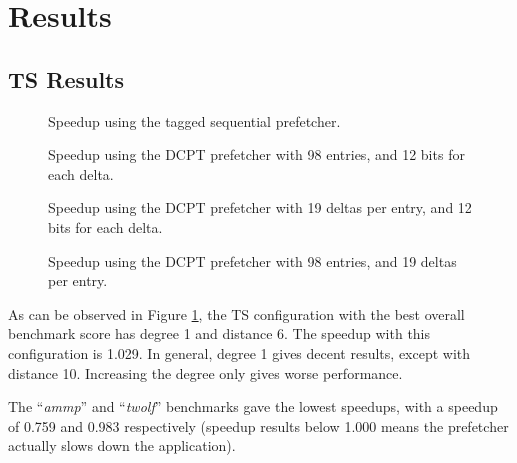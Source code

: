 \section{Results}
\label{sec:res}

\subsection{TS Results}

\begin{figure}[h]
    \begin{centering}
        
        \caption{Speedup using the tagged sequential prefetcher.}
        \label{figure:ts}
    \end{centering}
\end{figure}

\begin{figure}[h]
    \begin{centering}
        
        \caption{Speedup using the DCPT prefetcher with 98 entries, and 12 bits for each delta.}
        \label{figure:dcpt-num-deltas}
    \end{centering}
\end{figure}

\begin{figure}[h]
    \begin{centering}
        
        \caption{Speedup using the DCPT prefetcher with 19 deltas per entry, and 12 bits for each delta.}
        \label{figure:dcpt-table-size}
    \end{centering}
\end{figure}

\begin{figure}[h]
    \begin{centering}
        
        \caption{Speedup using the DCPT prefetcher with 98 entries, and 19 deltas per entry.}
        \label{figure:dcpt-delta-bits}
    \end{centering}
\end{figure}

As can be observed in Figure \ref{figure:ts}, the TS configuration with the best
overall benchmark score has degree 1 and distance 6. The speedup with this configuration is 1.029.
In general, degree 1 gives decent results, except with distance 10. Increasing the degree only gives worse performance.

The ``\emph{ammp}'' and ``\emph{twolf}'' benchmarks
gave the lowest speedups, with a speedup of 0.759 and 0.983 respectively (speedup
results below 1.000 means the prefetcher actually slows down the application).

